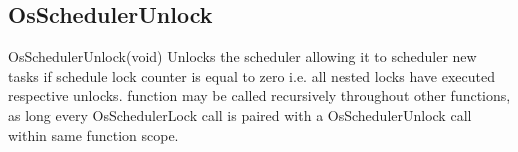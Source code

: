 \subsection{OsSchedulerUnlock}
\label{func:OsSchedulerUnlock}
\begin{pdfunction}
{OsSchedulerUnlock(void) }
{ 
Unlocks the scheduler allowing it to scheduler new tasks if 
schedule lock counter is equal to zero i.e. all nested locks have executed 
respective unlocks. 
function may be called recursively throughout other functions, as long 
every OsSchedulerLock call is paired with a OsSchedulerUnlock call within 
same function scope. }
\end{pdfunction}

